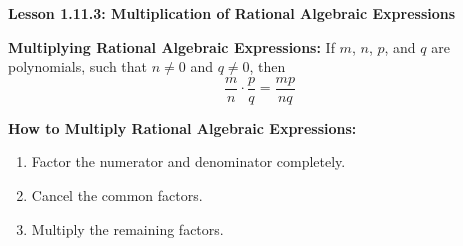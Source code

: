\begin{center}
\textbf{Lesson 1.11.3: Multiplication of Rational Algebraic Expressions}
\end{center}

\vspace*{1ex}

\textbf{Multiplying Rational Algebraic Expressions:} If $ m $, $ n $, $ p $, and $ q $ are polynomials, such that $ n \neq 0 $ and $ q \neq 0 $, then \[ \dfrac{m}{n} \cdot \dfrac{p}{q} = \dfrac{mp}{nq} \]

\textbf{How to Multiply Rational Algebraic Expressions:}
\begin{enumerate} 
	\item Factor the numerator and denominator completely.  
	\item Cancel the common factors. 
	\item Multiply the remaining factors.   
\end{enumerate}
 